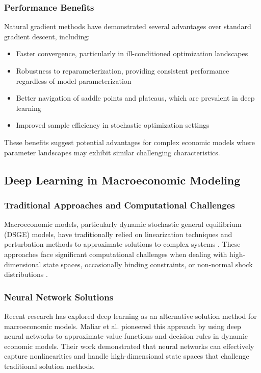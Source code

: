 \documentclass[a4paper]{article}
\begin{document}
\subsubsection{Performance Benefits}
Natural gradient methods have demonstrated several advantages over standard gradient descent, including:
\begin{itemize}
    \item Faster convergence, particularly in ill-conditioned optimization landscapes \cite{martens2015optimizing}
    \item Robustness to reparameterization, providing consistent performance regardless of model parameterization \cite{amari1998natural}
    \item Better navigation of saddle points and plateaus, which are prevalent in deep learning \cite{dauphin2014identifying}
    \item Improved sample efficiency in stochastic optimization settings \cite{kunstner2019limitations}
\end{itemize}

These benefits suggest potential advantages for complex economic models where parameter landscapes may exhibit similar challenging characteristics.

\subsection{Deep Learning in Macroeconomic Modeling}

\subsubsection{Traditional Approaches and Computational Challenges}
Macroeconomic models, particularly dynamic stochastic general equilibrium (DSGE) models, have traditionally relied on linearization techniques and perturbation methods to approximate solutions to complex systems \cite{fernandez2016solution}. These approaches face significant computational challenges when dealing with high-dimensional state spaces, occasionally binding constraints, or non-normal shock distributions \cite{judd2017solution}.

\subsubsection{Neural Network Solutions}
Recent research has explored deep learning as an alternative solution method for macroeconomic models. Maliar et al. \cite{maliar2021deep} pioneered this approach by using deep neural networks to approximate value functions and decision rules in dynamic economic models. Their work demonstrated that neural networks can effectively capture nonlinearities and handle high-dimensional state spaces that challenge traditional solution methods.
\end{document}
